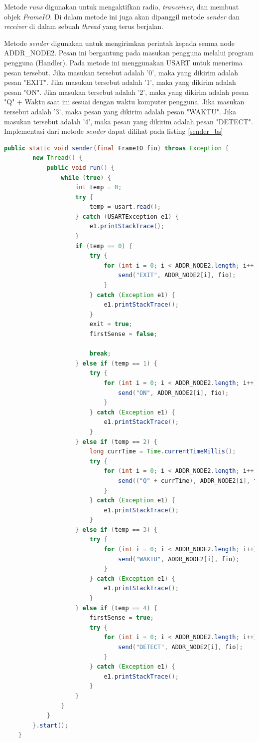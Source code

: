 Metode \textit{runs} digunakan untuk mengaktifkan radio, \textit{tranceiver}, dan membuat objek \textit{FrameIO}. Di dalam metode ini juga akan dipanggil metode \textit{sender} dan \textit{receiver} di dalam sebuah \textit{thread} yang terus berjalan.

Metode \textit{sender} digunakan untuk mengirimkan perintah kepada semua node ADDR\_NODE2. Pesan ini bergantung pada masukan pengguna melalui program pengguna (Handler). Pada metode ini menggunakan USART untuk menerima pesan tersebut. Jika masukan tersebut adalah '0', maka yang dikirim adalah pesan "EXIT". Jika  masukan tersebut adalah '1', maka yang dikirim adalah pesan "ON". Jika masukan tersebut adalah '2', maka yang dikirim adalah pesan "Q" + Waktu saat ini sesuai dengan waktu komputer pengguna. Jika masukan tersebut adalah '3', maka pesan yang dikirim adalah pesan "WAKTU". Jika masukan tersebut adalah '4', maka pesan yang dikirim adalah pesan "DETECT". Implementasi dari metode \textit{sender} dapat dilihat pada listing \ref{sender_bs}

\begin{lstlisting}[label=sender_bs, language=Java, caption=Metode sender pada kelas BS, numbers=none]
    public static void sender(final FrameIO fio) throws Exception {
		new Thread() {
			public void run() {
				while (true) {
					int temp = 0;
					try {
						temp = usart.read();
					} catch (USARTException e1) {
						e1.printStackTrace();
					}
					if (temp == 0) {
						try {
							for (int i = 0; i < ADDR_NODE2.length; i++) {
								send("EXIT", ADDR_NODE2[i], fio);
							}
						} catch (Exception e1) {
							e1.printStackTrace();
						}
						exit = true;
						firstSense = false;

						break;
					} else if (temp == 1) {
						try {
							for (int i = 0; i < ADDR_NODE2.length; i++) {
								send("ON", ADDR_NODE2[i], fio);
							}
						} catch (Exception e1) {
							e1.printStackTrace();
						}
					} else if (temp == 2) {
						long currTime = Time.currentTimeMillis();
						try {
							for (int i = 0; i < ADDR_NODE2.length; i++) {
								send(("Q" + currTime), ADDR_NODE2[i], fio);
							}
						} catch (Exception e1) {
							e1.printStackTrace();
						}
					} else if (temp == 3) {
						try {
							for (int i = 0; i < ADDR_NODE2.length; i++) {
								send("WAKTU", ADDR_NODE2[i], fio);
							}
						} catch (Exception e1) {
							e1.printStackTrace();
						}
					} else if (temp == 4) {
						firstSense = true;
						try {
							for (int i = 0; i < ADDR_NODE2.length; i++) {
								send("DETECT", ADDR_NODE2[i], fio);
							}
						} catch (Exception e1) {
							e1.printStackTrace();
						}
					}
				}
			}
		}.start();
	}
\end{lstlisting}

